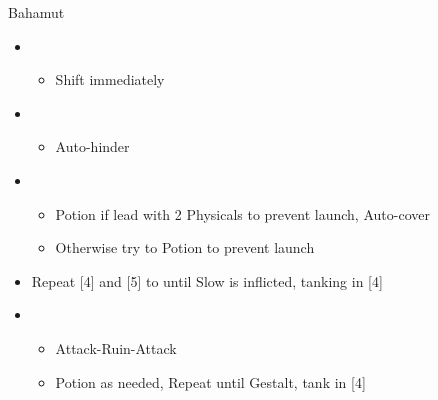 \begin{paracol}{2}
	\begin{battle}{Bahamut}
		\begin{itemize}
			\item \first
			      \begin{itemize}
				      \item Shift immediately
			      \end{itemize}
			\item \fifth
			      \begin{itemize}
				      \item Auto-hinder
			      \end{itemize}
			\item \fourth
			      \begin{itemize}
				      \item Potion if lead with 2 Physicals to prevent launch, Auto-cover
				      \item Otherwise try to Potion to prevent launch
			      \end{itemize}
			\item Repeat [4] and [5] to until Slow is inflicted, tanking in [4]
			\item \first
			      \begin{itemize}
				      \item Attack-Ruin-Attack
				      \item Potion as needed, Repeat until Gestalt, tank in [4]
			      \end{itemize}
		\end{itemize}
	\end{battle}
\end{paracol}
